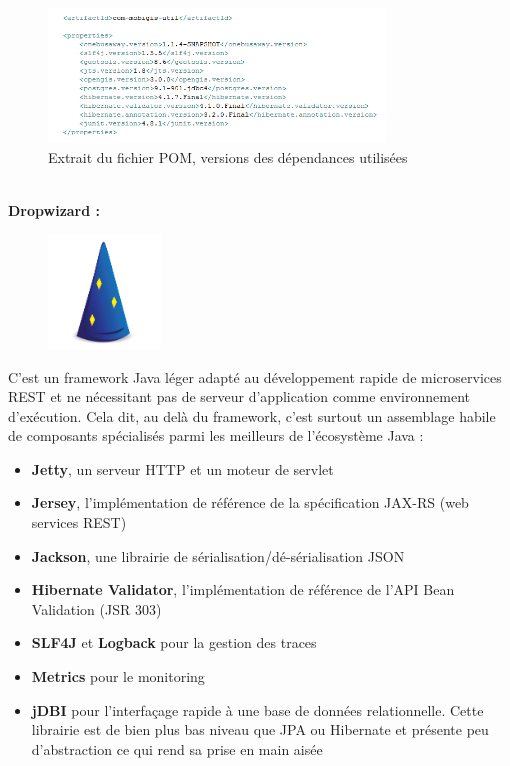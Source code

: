 \begin{itemize}
\begin{figure}[!h]
	\centering
		\includegraphics[width=0.8\textwidth]{images/Maven_POM_properties_Mobi-Admin-util.PNG}
	\caption{\label{fig:MavenPOM}Extrait du fichier POM, versions des dépendances utilisées}
\end{figure}
\\

\textbf{Dropwizard :}\label{Dropwizard}

\begin{figure}
\centering
\includegraphics[width=3cm]{images/dropwizard.png}
\end{figure}
\noindent C'est un framework Java léger adapté au développement rapide de microservices REST et ne nécessitant pas de serveur d'application comme environnement d'exécution.
Cela dit, au delà du framework, c'est surtout un assemblage habile de composants spécialisés parmi les meilleurs de l'écosystème Java :\\
\begin{itemize}
\item \textbf{Jetty}, un serveur HTTP et un moteur de servlet
\item \textbf{Jersey}, l'implémentation de référence de la spécification JAX-RS (web services REST) 
\item \textbf{Jackson}, une librairie de sérialisation/dé-sérialisation JSON 
\item \textbf{Hibernate Validator}, l'implémentation de référence de l'API Bean Validation (JSR 303) 
\item \textbf{SLF4J} et \textbf{Logback} pour la gestion des traces 
\item \textbf{Metrics} pour le monitoring 
\item \textbf{jDBI} pour l'interfaçage rapide à une base de données relationnelle. Cette librairie est de bien plus bas niveau que JPA ou Hibernate et présente peu d'abstraction ce qui rend sa prise en main aisée \\
\end{itemize}


\end{itemize}
